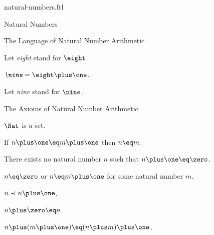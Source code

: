 \documentclass{naproche-library}
\begin{document}
\begin{smodule}{natural-numbers.ftl}
\begin{sfragment}{Natural Numbers}
\begin{sfragment}{The Language of Natural Number Arithmetic}
\begin{definition}[forthel,id=EightSig]
      Let \emph{eight} stand for $\eight$.
    \end{definition}


    \begin{definition}[forthel,id=NineSig]
      $\emph{\nine}=\eight\plus\one$.

      Let \emph{nine} stand for $\nine$.
    \end{definition}

  \end{sfragment}

  \begin{sfragment}{The Axioms of Natural Number Arithmetic}
    \begin{axiom}[forthel,title=Infinity Axiom,id=NatIsSetAx]
      $\Nat$ is a set.
    \end{axiom}

    \begin{axiom}[forthel,title=Peano Axiom I,id=PlusIsInjectiveAx]
      If $n\plus\one\eq m\plus\one$ then $n\eq m$.
    \end{axiom}
    \begin{axiom}[forthel,title=Peano Axiom II,id=ZeroIsNoSuccessorAx]
      There exists no natural number $n$ such that $n\plus\one\eq\zero$.
    \end{axiom}

    \begin{axiom}[forthel,title=Peano Axiom III,id=NatNumberIsZeroOrSuccessorAx]
      $n\eq\zero$ or $n\eq m\plus\one$ for some natural number $m$.
    \end{axiom}

    \begin{axiom}[forthel,title=Induction Axiom,id=InductionAx]
      $n\prec n\plus\one$.
    \end{axiom}

    \begin{axiom}[forthel,title=Addition Axiom I,id=AdditionWithZeroAx]
      $n\plus\zero\eq n$.
    \end{axiom}

    \begin{axiom}[forthel,title=Addition Axiom II,id=AdditionWithSuccessorAx]
      $n\plus(m\plus\one)\eq(n\plus m)\plus\one$.
    \end{axiom}
  \end{sfragment}


\end{sfragment}
\end{smodule}
\end{document}
